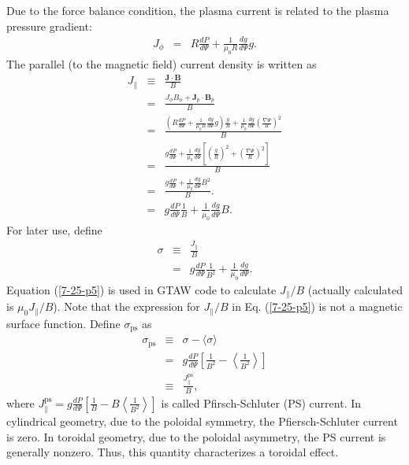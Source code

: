 \documentclass{llncs}
\newcommand{\tmop}[1]{\ensuremath{\operatorname{#1}}}
\begin{document}
Due to the force balance condition, the plasma current is related to the
plasma pressure gradient:
\begin{eqnarray}
  J_{\phi} & = & R \frac{d P}{d \Psi} + \frac{1}{\mu_0 R}  \frac{d g}{d \Psi}
  g.  \label{4-10-1}
\end{eqnarray}
The parallel (to the magnetic field) current density is written as
\begin{eqnarray}
  J_{\parallel} & \equiv & \frac{\mathbf{J} \cdot \mathbf{B}}{B} \nonumber\\
  & = & \frac{J_{\phi} B_{\phi} +\mathbf{J}_p \cdot \mathbf{B}_p}{B}
  \nonumber\\
  & = & \frac{\left( R \frac{d P}{d \Psi} + \frac{1}{\mu_0 R}  \frac{d g}{d
  \Psi} g \right) \frac{g}{R} + \frac{1}{\mu_0}  \frac{d g}{d \Psi} \left(
  \frac{\nabla \Psi}{R} \right)^2}{B} \nonumber\\
  & = & \frac{g \frac{d P}{d \Psi} + \frac{1}{\mu_0}  \frac{d g}{d \Psi}
  \left[  \left( \frac{g}{R} \right)^2 + \left( \frac{\nabla \Psi}{R}
  \right)^2 \right]}{B} \nonumber\\
  & = & \frac{g \frac{d P}{d \Psi} + \frac{1}{\mu_0}  \frac{d g}{d \Psi}
  B^2}{B} . \nonumber\\
  & = & g \frac{d P}{d \Psi}  \frac{1}{B} + \frac{1}{\mu_0}  \frac{d g}{d
  \Psi} B. 
\end{eqnarray}
For later use, define
\begin{eqnarray}
  \sigma & \equiv & \frac{J_{\parallel}}{B} \nonumber\\
  & = & g \frac{d P}{d \Psi}  \frac{1}{B^2} + \frac{1}{\mu_0}  \frac{d g}{d
  \Psi} .  \label{7-25-p5}
\end{eqnarray}
Equation (\ref{7-25-p5}) is used in GTAW code to calculate $J_{\parallel} / B$
(actually calculated is $\mu_0 J_{\parallel} / B$){\cite{hu2014}}. Note that
the expression for $J_{\parallel} / B$ in Eq. (\ref{7-25-p5}) is not a
magnetic surface function. Define $\sigma_{\tmop{ps}}$ as
\begin{eqnarray}
  \sigma_{\tmop{ps}} & \equiv & \sigma - \langle \sigma \rangle \nonumber\\
  & = & g \frac{d P}{d \Psi} \left[  \frac{1}{B^2} - \left\langle
  \frac{1}{B^2} \right\rangle \right] \\
  & \equiv & \frac{J_{\parallel}^{\tmop{ps}}}{B}, 
\end{eqnarray}
where $J_{\parallel}^{\tmop{ps}} = g \frac{d P}{d \Psi} \left[  \frac{1}{B} -
B \left\langle \frac{1}{B^2} \right\rangle \right]$ is called Pfirsch-Schluter
(PS) current. In cylindrical geometry, due to the poloidal symmetry, the
Pfiersch-Schluter current is zero. In toroidal geometry, due to the poloidal
asymmetry, the PS current is generally nonzero. Thus, this quantity
characterizes a toroidal effect.
\end{document}
